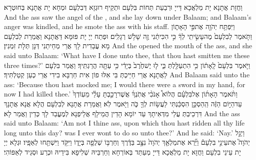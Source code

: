{וַחֲזָת אֲתָנָא יָת מַלְאֲכָא דַּייָ וּרְבַעַת תְּחוֹת בִּלְעָם וּתְקֵיף רוּגְזָא דְּבִלְעָם וּמְחָא יָת אֲתָנָא בְּחוּטְרָא׃}
{And the ass saw the angel of the \lord, and she lay down under Balaam; and Balaam’s anger was kindled, and he smote the ass with his staff.}{}
{וַיִּפְתַּ֥ח יְהֹוָ֖ה אֶת\maqqaf פִּ֣י הָאָת֑וֹן וַתֹּ֤אמֶר לְבִלְעָם֙ מֶה\maqqaf עָשִׂ֣יתִֽי לְךָ֔ כִּ֣י הִכִּיתַ֔נִי זֶ֖ה שָׁלֹ֥שׁ רְגָלִֽים׃}
{וּפְתַח יְיָ יָת פּוּמָּא דַּאֲתָנָא וַאֲמַרַת לְבִלְעָם מָא עֲבַדִית לָךְ אֲרֵי מְחֵיתַנִי דְּנָן תְּלָת זִמְנִין׃}
{And the \lord\space opened the mouth of the ass, and she said unto Balaam: ‘What have I done unto thee, that thou hast smitten me these three times?’}{}
{וַיֹּ֤אמֶר בִּלְעָם֙ לָֽאָת֔וֹן כִּ֥י הִתְעַלַּ֖לְתְּ בִּ֑י ל֤וּ יֶשׁ\maqqaf חֶ֙רֶב֙ בְּיָדִ֔י כִּ֥י עַתָּ֖ה הֲרַגְתִּֽיךְ׃}
{וַאֲמַר בִּלְעָם לַאֲתָנָא אֲרֵי חַיֵּיכְתְּ בִּי אִלּוּ פוֹן אִית חַרְבָּא בִידִי אֲרֵי כְעַן קְטַלְתִּיךְ׃}
{And Balaam said unto the ass: ‘Because thou hast mocked me; I would there were a sword in my hand, for now I had killed thee.’}{}
{וַתֹּ֨אמֶר הָאָת֜וֹן אֶל\maqqaf בִּלְעָ֗ם הֲלוֹא֩ אָנֹכִ֨י אֲתֹֽנְךָ֜ אֲשֶׁר\maqqaf רָכַ֣בְתָּ עָלַ֗י מֵעֽוֹדְךָ֙ עַד\maqqaf הַיּ֣וֹם הַזֶּ֔ה הַֽהַסְכֵּ֣ן הִסְכַּ֔נְתִּי לַעֲשׂ֥וֹת לְךָ֖ כֹּ֑ה וַיֹּ֖אמֶר לֹֽא׃}
{וַאֲמַרַת אֲתָנָא לְבִלְעָם הֲלָא אֲנָא אֲתָנָךְ דִּרְכֵיבְתְּ עֲלַי מִדְּאִיתָךְ עַד יוֹמָא הָדֵין הֲמֵילָף אֲלֵיפְנָא לְמֶעֱבַד לָךְ כְּדֵין וַאֲמַר לָא׃}
{And the ass said unto Balaam: ‘Am not I thine ass, upon which thou hast ridden all thy life long unto this day? was I ever wont to do so unto thee?’ And he said: ‘Nay.’}{}
{וַיְגַ֣ל יְהֹוָה֮ אֶת\maqqaf עֵינֵ֣י בִלְעָם֒ וַיַּ֞רְא אֶת\maqqaf מַלְאַ֤ךְ יְהֹוָה֙ נִצָּ֣ב בַּדֶּ֔רֶךְ וְחַרְבּ֥וֹ שְׁלֻפָ֖ה בְּיָד֑וֹ וַיִּקֹּ֥ד וַיִּשְׁתַּ֖חוּ לְאַפָּֽיו׃}
{וּגְלָא יְיָ יָת עֵינֵי בִלְעָם וַחֲזָא יָת מַלְאֲכָא דַּייָ מְעַתַּד בְּאוֹרְחָא וְחַרְבֵּיהּ שְׁלִיפָא בִּידֵיהּ וּכְרַע וּסְגֵיד לְאַפּוֹהִי׃}
